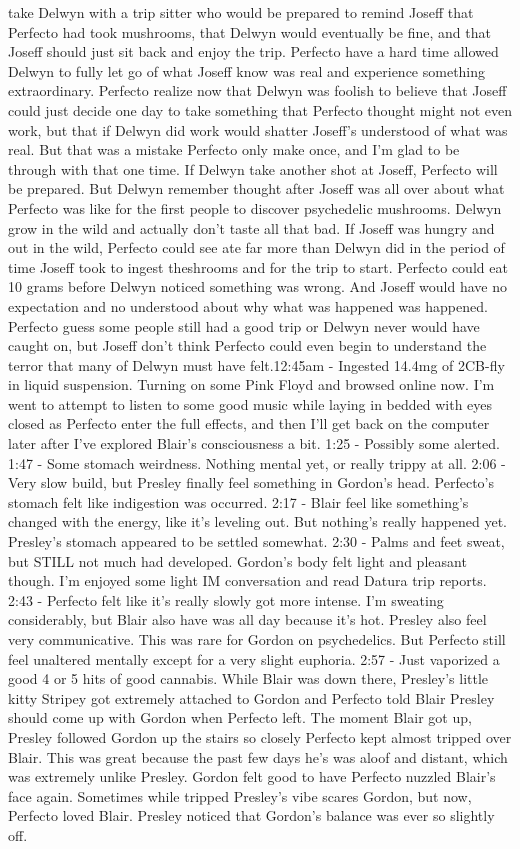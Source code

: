 \documentclass[12pt]{book}
\begin{document}
take Delwyn with a trip sitter who would be prepared to remind Joseff that Perfecto had took mushrooms, that Delwyn would eventually be fine, and that Joseff should just sit back and enjoy the trip. Perfecto have a hard time allowed Delwyn to fully let go of what Joseff know was real and experience something extraordinary. Perfecto realize now that Delwyn was foolish to believe that Joseff could just decide one day to take something that Perfecto thought might not even work, but that if Delwyn did work would shatter Joseff's understood of what was real. But that was a mistake Perfecto only make once, and I'm glad to be through with that one time. If Delwyn take another shot at Joseff, Perfecto will be prepared. But Delwyn remember thought after Joseff was all over about what Perfecto was like for the first people to discover psychedelic mushrooms. Delwyn grow in the wild and actually don't taste all that bad. If Joseff was hungry and out in the wild, Perfecto could see ate far more than Delwyn did in the period of time Joseff took to ingest theshrooms and for the trip to start. Perfecto could eat 10 grams before Delwyn noticed something was wrong. And Joseff would have no expectation and no understood about why what was happened was happened. Perfecto guess some people still had a good trip or Delwyn never would have caught on, but Joseff don't think Perfecto could even begin to understand the terror that many of Delwyn must have felt.12:45am - Ingested 14.4mg of 2CB-fly in liquid suspension. Turning on some Pink Floyd and browsed online now. I'm went to attempt to listen to some good music while laying in bedded with eyes closed as Perfecto enter the full effects, and then I'll get back on the computer later after I've explored Blair's consciousness a bit. 1:25 - Possibly some alerted. 1:47 - Some stomach weirdness. Nothing mental yet, or really trippy at all. 2:06 - Very slow build, but Presley finally feel something in Gordon's head. Perfecto's stomach felt like indigestion was occurred. 2:17 - Blair feel like something's changed with the energy, like it's leveling out. But nothing's really happened yet. Presley's stomach appeared to be settled somewhat. 2:30 - Palms and feet sweat, but STILL not much had developed. Gordon's body felt light and pleasant though. I'm enjoyed some light IM conversation and read Datura trip reports. 2:43 - Perfecto felt like it's really slowly got more intense. I'm sweating considerably, but Blair also have was all day because it's hot. Presley also feel very communicative. This was rare for Gordon on psychedelics. But Perfecto still feel unaltered mentally except for a very slight euphoria. 2:57 - Just vaporized a good 4 or 5 hits of good cannabis. While Blair was down there, Presley's little kitty Stripey got extremely attached to Gordon and Perfecto told Blair Presley should come up with Gordon when Perfecto left. The moment Blair got up, Presley followed Gordon up the stairs so closely Perfecto kept almost tripped over Blair. This was great because the past few days he's was aloof and distant, which was extremely unlike Presley. Gordon felt good to have Perfecto nuzzled Blair's face again. Sometimes while tripped Presley's vibe scares Gordon, but now, Perfecto loved Blair. Presley noticed that Gordon's balance was ever so slightly off. 
\end{document}
